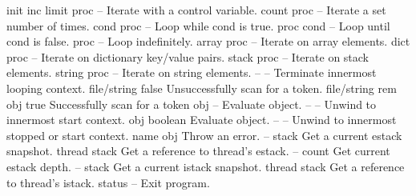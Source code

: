 \begin{longtable}{}
\optableent
	{init inc limit proc}
	{{\bf {}}}
	{--}
	{Iterate with a control variable.}
\hline
\optableent
	{count proc}
	{{\bf {}}}
	{--}
	{Iterate a set number of times.}
\hline
\optableent
	{cond proc}
	{{\bf {}}}
	{--}
	{ Loop while cond is true.}
\hline
\optableent
	{proc cond}
	{{\bf {}}}
	{--}
	{ Loop until cond is false.}
\hline
\optableent
	{proc}
	{{\bf {}}}
	{--}
	{ Loop indefinitely.}
\hline
\optableent
	{array proc}
	{{\bf {}}}
	{--}
	{Iterate on array elements.}
\optableent
	{dict proc}
	{{\bf {}}}
	{--}
	{Iterate on dictionary key/value pairs.}
\optableent
	{stack proc}
	{{\bf {}}}
	{--}
	{Iterate on stack elements.}
\optableent
	{string proc}
	{{\bf {}}}
	{--}
	{Iterate on string elements.}
\hline
\optableent
	{--}
	{{\bf {}}}
	{--}
	{Terminate innermost looping context.}
\hline
\optableent
	{file/string}
	{{\bf {}}}
	{false}
	{Unsuccessfully scan for a token.}
\optableent
	{file/string}
	{{\bf {}}}
	{rem obj true}
	{Successfully scan for a token}
\hline
\optableent
	{obj}
	{{\bf {}}}
	{--}
	{Evaluate object.}
\hline
\optableent
	{--}
	{{\bf {}}}
	{--}
	{Unwind to innermost start context.}
\hline
\optableent
	{obj}
	{{\bf {}}}
	{boolean}
	{Evaluate object.}
\hline
\optableent
	{--}
	{{\bf {}}}
	{--}
	{Unwind to innermost stopped or start context.}
\hline
\optableent
	{name}
	{{\bf {}}}
	{obj}
	{Throw an error.}
\hline
\optableent
	{--}
	{{\bf {}}}
	{stack}
	{Get a current estack snapshot.}
\hline
\optableent
	{thread}
	{{\bf {}}}
	{stack}
	{Get a reference to thread's estack.}
\hline
\optableent
	{--}
	{{\bf {}}}
	{count}
	{Get current estack depth.}
\hline
\optableent
	{--}
	{{\bf {}}}
	{stack}
	{Get a current istack snapshot.}
\hline
\optableent
	{thread}
	{{\bf {}}}
	{stack}
	{Get a reference to thread's istack.}
\hline
\optableent
	{status}
	{{\bf {}}}
	{--}
	{Exit program.}
\hline
\optableent

\end{longtable}
